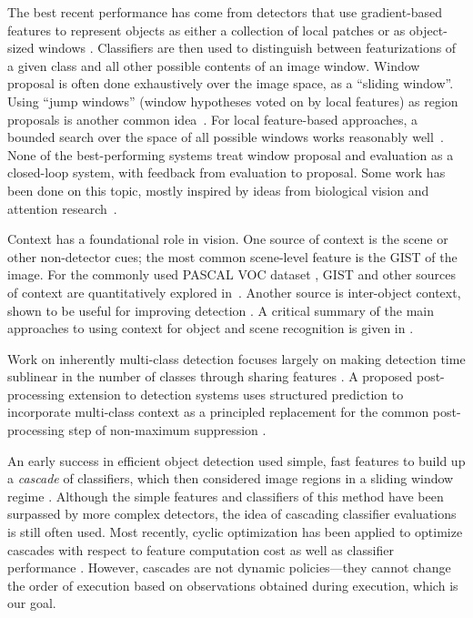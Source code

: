 The best recent performance has come from detectors that use gradient-based features to represent objects as either a collection of local patches or as object-sized windows \cite{Dalal2005,Lowe2004}.
Classifiers are then used to distinguish between featurizations of a given class and all other possible contents of an image window.
%
Window proposal is often done exhaustively over the image space, as a ``sliding window''.
Using ``jump windows'' (window hypotheses voted on by local features) as region proposals is another common idea~\cite{Vedaldi2009,Vijayanarasimhan2011}.
For local feature-based approaches, a bounded search over the space of all possible windows works reasonably well~\cite{Lampert2008a}.
%
None of the best-performing systems treat window proposal and evaluation as a closed-loop system, with feedback from evaluation to proposal.
Some work has been done on this topic, mostly inspired by ideas from biological vision and attention research~\cite{Butko2009,Vogel2008,Paletta2005}.

Context has a foundational role in vision.
One source of context is the scene or other non-detector cues; the most common scene-level feature is the GIST \cite{Oliva2001a} of the image.
For the commonly used PASCAL VOC dataset \cite{pascal-voc-2010}, GIST and other sources of context are quantitatively explored in~\cite{Divvala2009}. 
%
Another source is inter-object context, shown to be useful for improving detection \cite{Torralba2004}.
A critical summary of the main approaches to using context for object and scene recognition is given in \cite{Galleguillos2010}.

Work on inherently multi-class detection focuses largely on making detection time sublinear in the number of classes through sharing features \cite{Torralba2007,Fan2005,Razavi2011}.
A proposed post-processing extension to detection systems uses structured prediction to incorporate multi-class context as a principled replacement for the common post-processing step of non-maximum suppression \cite{Desai2009}.

An early success in efficient object detection used simple, fast features to build up a \emph{cascade} of classifiers, which then considered image regions in a sliding window regime \cite{Viola2001}.
Although the simple features and classifiers of this method have been surpassed by more complex detectors, the idea of cascading classifier evaluations is still often used.
Most recently, cyclic optimization has been applied to optimize cascades with respect to feature computation cost as well as classifier performance \cite{Chen2012}.
However, cascades are not dynamic policies---they cannot change the order of execution based on observations obtained during execution, which is our goal.

